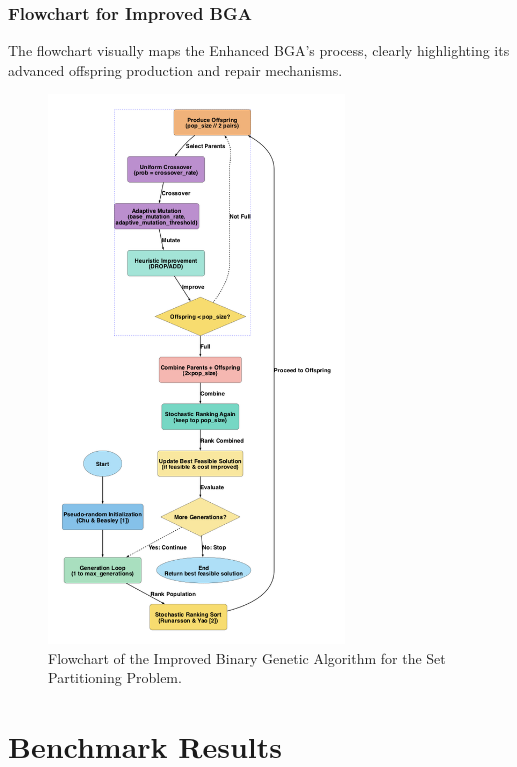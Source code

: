 \documentclass[12pt]{article}
\begin{document}
\subsubsection{Flowchart for Improved BGA}
The flowchart visually maps the Enhanced BGA’s process, clearly highlighting its advanced offspring production and repair mechanisms.
\begin{figure}[htbp]
  \centering
  \includegraphics[width=0.70\textwidth]{images/improved_bga_flowchart.png}
  \caption{Flowchart of the Improved Binary Genetic Algorithm for the Set Partitioning Problem.}
  \label{fig:flowchart3}
\end{figure}

\newpage

\section{Benchmark Results}
\label{sec:benchmark_results}
\end{document}
